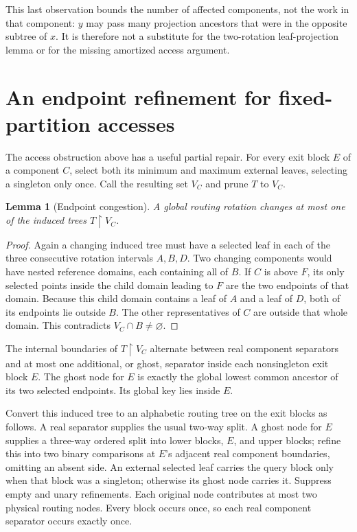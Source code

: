 \documentclass[11pt]{article}
\newtheorem{lemma}{Lemma}
\begin{document}
This last observation bounds the number of affected components, not
the work in that component: $y$ may pass many projection ancestors that
were in the opposite subtree of $x$. It is therefore not a substitute
for the two-rotation leaf-projection lemma or for the missing amortized
access argument.

\section*{An endpoint refinement for fixed-partition accesses}

The access obstruction above has a useful partial repair. For every
exit block $E$ of a component $C$, select both its minimum and maximum
external leaves, selecting a singleton only once. Call the resulting
set $V_C$ and prune $T$ to $V_C$.

\begin{lemma}[Endpoint congestion]
A global routing rotation changes at most one of the induced trees
$T\upharpoonright V_C$.
\end{lemma}

\begin{proof}
Again a changing induced tree must have a selected leaf in each of
the three consecutive rotation intervals $A,B,D$. Two changing
components would have nested reference domains, each containing all
of $B$. If $C$ is above $F$, its only selected points inside the child
domain leading to $F$ are the two endpoints of that domain. Because
this child domain contains a leaf of $A$ and a leaf of $D$, both of
its endpoints lie outside $B$. The other representatives of $C$ are
outside that whole domain. This contradicts $V_C\cap B\ne\varnothing$.
\end{proof}

The internal boundaries of $T\upharpoonright V_C$ alternate between
real component separators and at most one additional, or ghost,
separator inside each nonsingleton exit block $E$. The ghost node for
$E$ is exactly the global lowest common ancestor of its two selected
endpoints. Its global key lies inside $E$.

Convert this induced tree to an alphabetic routing tree on the exit
blocks as follows. A real separator supplies the usual two-way split.
A ghost node for $E$ supplies a three-way ordered split into lower
blocks, $E$, and upper blocks; refine this into two binary comparisons
at $E$'s adjacent real component boundaries, omitting an absent side.
An external selected leaf carries the query block only when that block
was a singleton; otherwise its ghost node carries it. Suppress empty
and unary refinements. Each original node contributes at most two
physical routing nodes. Every block occurs once, so each real component
separator occurs exactly once.
\end{document}
